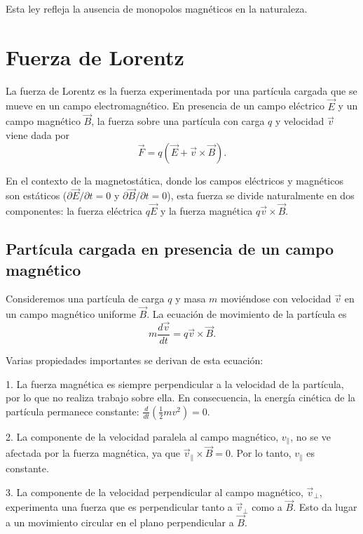 \documentclass[12pt,a4paper]{book}
\begin{document}
Esta ley refleja la ausencia de monopolos magnéticos en la naturaleza.

\section{Fuerza de Lorentz}

La fuerza de Lorentz es la fuerza experimentada por una partícula cargada que se mueve en un campo electromagnético. En presencia de un campo eléctrico $\vec{E}$ y un campo magnético $\vec{B}$, la fuerza sobre una partícula con carga $q$ y velocidad $\vec{v}$ viene dada por
\begin{equation}
\vec{F} = q(\vec{E} + \vec{v} \times \vec{B}).
\end{equation}

En el contexto de la magnetostática, donde los campos eléctricos y magnéticos son estáticos ($\partial \vec{E}/\partial t = 0$ y $\partial \vec{B}/\partial t = 0$), esta fuerza se divide naturalmente en dos componentes: la fuerza eléctrica $q\vec{E}$ y la fuerza magnética $q\vec{v} \times \vec{B}$.

\subsection{Partícula cargada en presencia de un campo magnético}

Consideremos una partícula de carga $q$ y masa $m$ moviéndose con velocidad $\vec{v}$ en un campo magnético uniforme $\vec{B}$. La ecuación de movimiento de la partícula es
\begin{equation}
m\frac{d\vec{v}}{dt} = q\vec{v} \times \vec{B}.
\end{equation}

Varias propiedades importantes se derivan de esta ecuación:

1. La fuerza magnética es siempre perpendicular a la velocidad de la partícula, por lo que no realiza trabajo sobre ella. En consecuencia, la energía cinética de la partícula permanece constante: $\frac{d}{dt}(\frac{1}{2}mv^2) = 0$.

2. La componente de la velocidad paralela al campo magnético, $v_{\parallel}$, no se ve afectada por la fuerza magnética, ya que $\vec{v}_{\parallel} \times \vec{B} = 0$. Por lo tanto, $v_{\parallel}$ es constante.

3. La componente de la velocidad perpendicular al campo magnético, $\vec{v}_{\perp}$, experimenta una fuerza que es perpendicular tanto a $\vec{v}_{\perp}$ como a $\vec{B}$. Esto da lugar a un movimiento circular en el plano perpendicular a $\vec{B}$.
\end{document}
